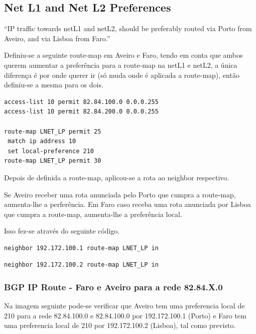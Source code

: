 \documentclass[11pt,a4paper]{report}
\begin{document}
\subsection{Net L1 and Net L2 Preferences}

``IP traffic towards netL1 and netL2, should be preferably routed via Porto from Aveiro, and via Lisboa from Faro.''
\newline

Definiu-se a seguinte route-map em Aveiro e Faro, tendo em conta que ambos querem aumentar a preferência para a route-map na netL1 e netL2, a única diferença é por onde querer ir (só muda onde é aplicada a route-map), então definiu-se a mesma para os dois.

\begin{lstlisting}[caption=Route-map para a netL1 e netL2]
access-list 10 permit 82.84.100.0 0.0.0.255
access-list 10 permit 82.84.200.0 0.0.0.255

route-map LNET_LP permit 25
 match ip address 10
 set local-preference 210
route-map LNET_LP permit 30
\end{lstlisting}

Depois de definida a route-map, aplicou-se a rota ao neighbor respectivo.

Se Aveiro receber uma rota anunciada pelo Porto que cumpra a route-map, aumenta-lhe a perferência. Em Faro caso receba uma rota anunciada por Lisboa que cumpra a route-map, aumenta-lhe a preferência local.

Isso fez-se através do seguinte código.\\
\begin{lstlisting}[caption=Route-map LNET\_LP no Neighbor Porto no Router de Aveiro]
  neighbor 192.172.100.1 route-map LNET_LP in
\end{lstlisting}

\begin{lstlisting}[caption=Route-map LNET\_LP no Neighbor Lisboa no Router de Faro]
  neighbor 192.172.100.2 route-map LNET_LP in
\end{lstlisting}

\subsubsection{BGP IP Route - Faro e Aveiro para a rede 82.84.X.0}

Na imagem seguinte pode-se verificar que Aveiro tem uma preferencia local de 210 para a rede 82.84.100.0 e 82.84.100.0 por 192.172.100.1 (Porto) e Faro tem uma preferencia local de 210 por 192.172.100.2 (Lisboa), tal como previsto.
\end{document}
